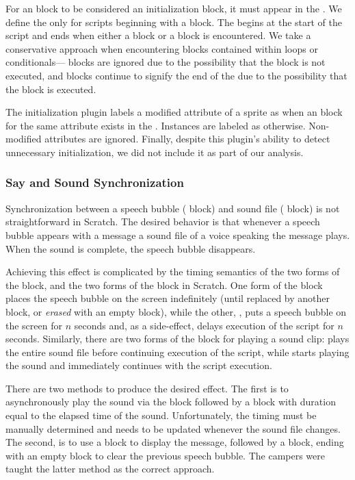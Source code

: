For an \abs{} block to be considered an initialization block, it must appear in
the \initzone{}. We define the \initzone{} only for scripts beginning with a
\greenflag{} block. The \initzone{} begins at the start of the script and ends
when either a \rel{} block or a \broadcast{} block is encountered. We take a
conservative approach when encountering blocks contained within loops or
conditionals---\abs{} blocks are ignored due to the possibility that the block
is not executed, and \rel{} blocks continue to signify the end of the
\initzone{} due to the possibility that the block is executed.

The initialization plugin labels a modified attribute of a sprite as \correct{}
when an \abs{} block for the same attribute exists in the
\initzone{}. Instances are labeled as \incor{} otherwise. Non-modified
attributes are ignored. Finally, despite this plugin's ability to detect
unnecessary initialization, we did not include it as part of our analysis.


\subsubsection{Say and Sound Synchronization}
Synchronization between a speech bubble (\say{} block) and sound file
(\playsound{} block) is not straightforward in Scratch. The desired behavior is
that whenever a speech bubble appears with a message a sound file of a voice
speaking the message plays. When the sound is complete, the speech bubble
disappears.

Achieving this effect is complicated by the timing semantics of the two forms
of the \say{} block, and the two forms of the \playsound{} block in Scratch.
One form of the \say{} block places the speech bubble on the screen
indefinitely (until replaced by another \say{} block, or \emph{erased} with an
empty \say{} block), while the other, \sayfor{}, puts a speech bubble on the
screen for $n$ seconds and, as a side-effect, delays execution of the script
for $n$ seconds. Similarly, there are two forms of the block for playing a
sound clip: \playsounddone{} plays the entire sound file before continuing
execution of the script, while \playsound{} starts playing the sound and
immediately continues with the script execution.

There are two methods to produce the desired effect.  The first is to
asynchronously play the sound via the \playsound{} block followed by a
\sayfor{} block with duration equal to the elapsed time of the sound.
Unfortunately, the timing must be manually determined and needs to be updated
whenever the sound file changes.  The second, is to use a \say{} block to
display the message, followed by a \playsounddone{} block, ending with an empty
\say{} block to clear the previous speech bubble. The campers were taught the
latter method as the correct approach.

